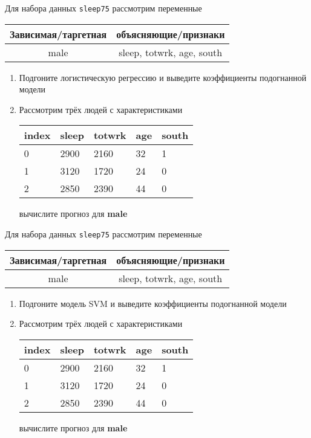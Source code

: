 \begin{exercise}
Для набора данных \texttt{sleep75} рассмотрим переменные

\begin{center}
	\begin{tabular}{|c|c|} \hline
		Зависимая/таргетная & объясняющие/признаки \\ \hline
		male & sleep, totwrk, age, south \\ \hline
	\end{tabular}
\end{center}
\begin{enumerate}
	\item Подгоните логистическую регрессию и выведите коэффициенты подогнанной модели
	\item Рассмотрим трёх людей с характеристиками
	\begin{center}
		\begin{tabular}{|l||l|l|l|l|}\hline
			index & sleep & totwrk & age & south  \\ \hline\hline
			0 & 2900 & 2160 & 32 & 1  \\
			1 & 3120 & 1720 & 24 & 0  \\
			2 & 2850 & 2390 & 44 & 0  \\ \hline
		\end{tabular}
	\end{center}
	вычислите прогноз для \textbf{male} 
\end{enumerate}
\end{exercise}

\begin{exercise}
Для набора данных \texttt{sleep75} рассмотрим переменные

\begin{center}
	\begin{tabular}{|c|c|} \hline
		Зависимая/таргетная & объясняющие/признаки \\ \hline
		male & sleep, totwrk, age, south \\ \hline
	\end{tabular}
\end{center}

\begin{enumerate}
	\item Подгоните модель SVM и выведите коэффициенты подогнанной модели
	\item Рассмотрим трёх людей с характеристиками
	\begin{center}
		\begin{tabular}{|l||l|l|l|l|}\hline
			index & sleep & totwrk & age & south  \\ \hline\hline
			0 & 2900 & 2160 & 32 & 1  \\
			1 & 3120 & 1720 & 24 & 0  \\
			2 & 2850 & 2390 & 44 & 0  \\ \hline
		\end{tabular}
	\end{center}
	вычислите прогноз для \textbf{male} 
\end{enumerate}
\end{exercise}

